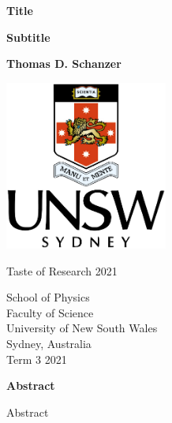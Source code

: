 \documentclass[12pt,titlepage]{article}
\begin{document}
% 

\begin{titlepage}
    \begin{center}
        
        \vspace{1cm} 
        \Huge
        \textbf{Title}
        
        \Large
        \textbf{Subtitle}
            
        \vspace{0.75cm}
            
        \textbf{Thomas D. Schanzer}
            
        \vspace{1.5cm}
            
        \includegraphics[width=0.4\textwidth]{figures/unsw}

        \vspace{1cm}

        \large    
        Taste of Research 2021

        \vspace{1cm}
            
        \large
        School of Physics\\
        Faculty of Science\\
        University of New South Wales\\
        Sydney, Australia\\
        \vspace{0.5cm}
        Term 3 2021
        \vfil
            
    \end{center}
\end{titlepage}

\begin{center}
	\large
	\textbf{Abstract}
\end{center}

Abstract
\end{document}
